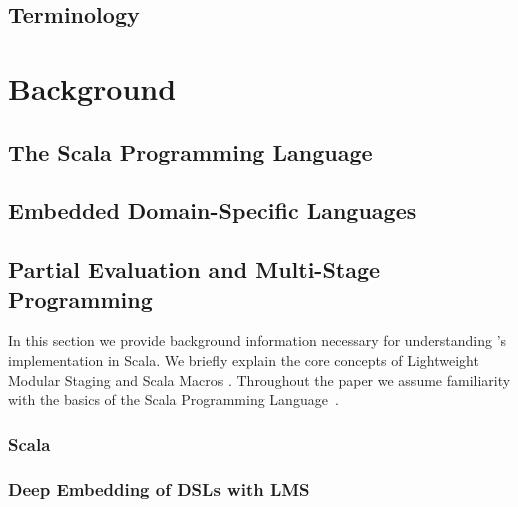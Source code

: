 %
%





\section{Terminology}
\label{sec:terminology}



\chapter{Background}
\label{ch:background}

\section{The Scala Programming Language}
\section{Embedded Domain-Specific Languages}
\section{Partial Evaluation and Multi-Stage Programming}

In this section we provide background information necessary for understanding \yy's
implementation in Scala. We briefly explain the core concepts of Lightweight Modular Staging
\cite{rompf_lightweight_2012,rompf_optimizing_2013} and Scala Macros
\cite{burmako_scala_2013}. Throughout the paper we assume familiarity with
the basics of the Scala Programming Language~\cite{odersky_scala_2004}.
\subsection{Scala}
\subsection{Deep Embedding of DSLs with LMS}
\label{subsec:deep-embedding}

